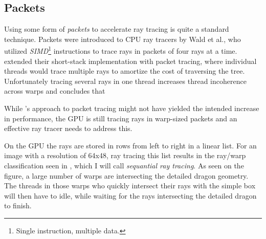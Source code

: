 \subsection{Packets}


Using some form of \textit{packets} to accelerate ray tracing is quite a
standard technique. Packets were introduced to CPU ray tracers by Wald et
al., who utilized \textit{SIMD}\footnote{Single
  instruction, multiple data.} instructions to trace rays in packets of four
rays at a time. \horn{} extended their short-stack implementation with packet
tracing, where individual threads would trace multiple rays to amortize the cost
of traversing the tree. Unfortunately tracing several rays in one thread
increases thread incoherence across warps and \aila{} concludes that




While \horn's approach to packet tracing might not have yielded the intended
increase in performance, the GPU is still tracing rays in warp-sized packets and
an effective ray tracer needs to address this.

On the GPU the rays are stored in rows from left to right in a linear list. For
an image with a resolution of 64x48, ray tracing this list results in the
ray/warp classification seen in , which I will
call \textit{sequantial ray tracing}. As seen on the figure, a large number of
warps are intersecting the detailed dragon geometry. The threads in those warps
who quickly intersect their rays with the simple box will then have to idle,
while waiting for the rays intersecting the detailed dragon to finish.

